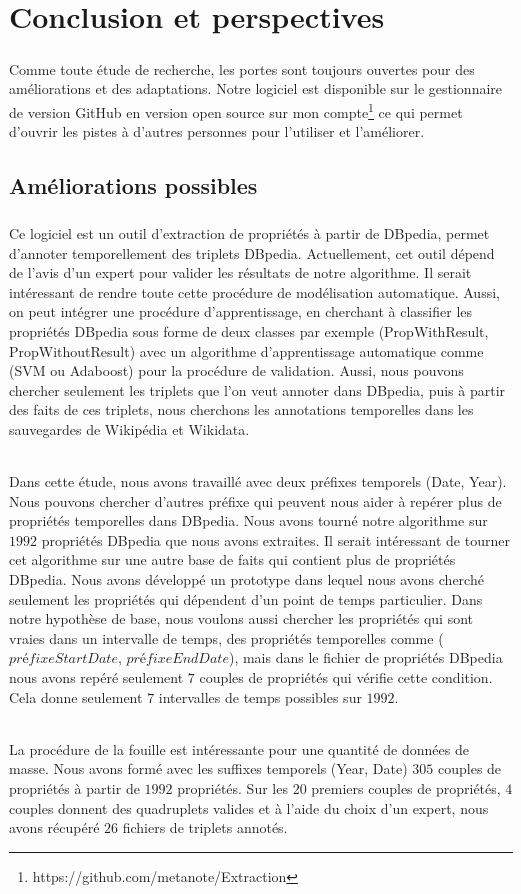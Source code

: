\chapter{Conclusion et perspectives}
\paragraph{}
Comme toute étude de recherche, les portes sont toujours ouvertes pour des améliorations et des adaptations. Notre logiciel est disponible sur le gestionnaire de version GitHub en version open source sur mon compte\footnote{https://github.com/metanote/Extraction} ce qui permet d'ouvrir les pistes à d'autres personnes pour l'utiliser et l'améliorer. 
\section*{Améliorations possibles}
\paragraph{}
Ce logiciel est un outil d'extraction de propriétés à partir de DBpedia, permet d'annoter temporellement des triplets DBpedia. Actuellement, cet outil dépend de l'avis d'un expert pour valider les résultats de notre algorithme. Il serait intéressant de rendre toute cette procédure de modélisation automatique. Aussi, on peut intégrer une procédure d'apprentissage, en cherchant à classifier les propriétés DBpedia sous forme de deux classes par exemple (PropWithResult, PropWithoutResult) avec un algorithme d'apprentissage automatique comme (SVM ou Adaboost) pour la procédure de validation. Aussi, nous pouvons chercher seulement les triplets que l'on veut annoter dans DBpedia, puis à partir des faits de ces triplets, nous cherchons les annotations temporelles dans les sauvegardes de Wikipédia et Wikidata.
\subparagraph{}
Dans cette étude, nous avons travaillé avec deux préfixes temporels (Date, Year). Nous pouvons chercher d'autres préfixe qui peuvent nous aider à repérer plus de propriétés temporelles dans DBpedia. Nous avons tourné notre algorithme sur $1992$ propriétés DBpedia que nous avons extraites. Il serait intéressant de tourner cet algorithme sur une autre base de faits qui contient plus de propriétés DBpedia.
Nous avons développé un prototype dans lequel nous avons cherché seulement les propriétés qui dépendent d'un point de temps particulier.
Dans notre hypothèse de base, nous voulons aussi chercher les propriétés qui sont vraies dans un intervalle de temps, des propriétés temporelles comme ($préfixeStartDate$, $préfixeEndDate$), mais dans le fichier de propriétés DBpedia nous avons repéré seulement $7$ couples de propriétés qui vérifie cette condition. Cela donne seulement $7$ intervalles de temps possibles sur $1992$.
\subparagraph{}
La procédure de la fouille est intéressante pour une quantité de données de masse. Nous avons formé avec les suffixes temporels (Year, Date) $305$ couples de propriétés à partir de $1992$ propriétés. Sur les $20$ premiers couples de propriétés, $4$ couples donnent des quadruplets valides et à l'aide du choix d'un expert, nous avons récupéré $26$ fichiers de triplets annotés. 
\newpage
